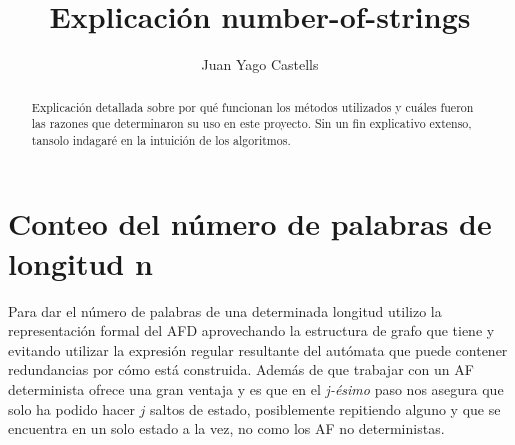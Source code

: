 \documentclass{scrartcl}
\title{Explicación number-of-strings}
\author{Juan Yago Castells}
\begin{document}
\maketitle

\begin{abstract}
Explicación detallada sobre por qué funcionan los métodos utilizados y cuáles fueron las razones que determinaron su uso en este proyecto. Sin un fin explicativo extenso, tansolo indagaré en la intuición de los algoritmos. 
\end{abstract}

\section{Conteo del número de palabras de longitud n}
Para dar el número de palabras de una determinada longitud utilizo la representación formal del AFD aprovechando la estructura de grafo que tiene y evitando utilizar la expresión regular resultante del autómata que puede contener redundancias por cómo está construida. Además de que trabajar con un AF determinista ofrece una gran ventaja y es que en el \textit{j-ésimo} paso nos asegura que solo ha podido hacer $j$ saltos de estado, posiblemente repitiendo alguno y que se encuentra en un solo estado a la vez, no como los AF no deterministas.
\end{document}
